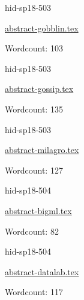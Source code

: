

\begin{IU}

hid-sp18-503

\href{https://github.com/cloudmesh-community/hid-sp18-503/blob/master//technology/abstract-gobblin.tex}{abstract-gobblin.tex}

 

Wordcount: 103

\end{IU}



\begin{IU}

hid-sp18-503

\href{https://github.com/cloudmesh-community/hid-sp18-503/blob/master//technology/abstract-gossip.tex}{abstract-gossip.tex}

 

Wordcount: 135

\end{IU}



\begin{IU}

hid-sp18-503

\href{https://github.com/cloudmesh-community/hid-sp18-503/blob/master//technology/abstract-milagro.tex}{abstract-milagro.tex}

 

Wordcount: 127

\end{IU}



\begin{IU}

hid-sp18-504

\href{https://github.com/cloudmesh-community/hid-sp18-504/blob/master//technology/abstract-bigml.tex}{abstract-bigml.tex}

 

Wordcount: 82

\end{IU}



\begin{IU}

hid-sp18-504

\href{https://github.com/cloudmesh-community/hid-sp18-504/blob/master//technology/abstract-datalab.tex}{abstract-datalab.tex}

 

Wordcount: 117

\end{IU}

